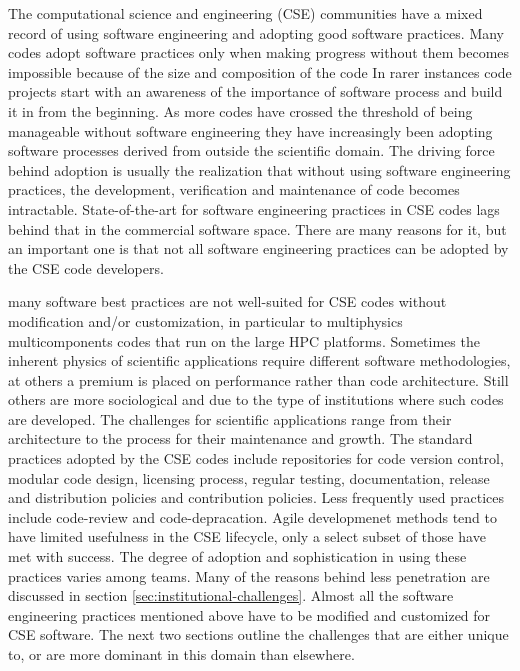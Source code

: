 \label{sec:introduction}
The computational science and engineering (CSE) communities have a mixed record
of using software engineering and adopting good software
practices. Many codes adopt software practices only when making
progress without them becomes impossible because of the size and
composition of the code  In rarer instances code projects start with
an awareness of the importance of software process and build it in
from the beginning. As more codes have crossed the threshold of being 
manageable without software engineering they have increasingly been  
adopting software processes derived from outside the scientific
domain. The driving force behind adoption is usually the realization
that without using software engineering practices, the development,
verification and maintenance of code becomes
intractable. State-of-the-art for software engineering
practices in CSE codes lags behind that in the commercial software
space. There are many reasons for it, but an important one is that
not all software engineering practices can be adopted by the CSE code
developers. 

many software best practices are not well-suited for CSE codes without
modification and/or customization, in particular to multiphysics
multicomponents codes that run on the large HPC platforms. Sometimes
the inherent physics of scientific applications require different
software methodologies, at others a premium is placed on
performance rather than code architecture.  Still others are more
sociological and due to the type of institutions where such codes are
developed. The challenges for scientific applications range
from their architecture to the process for their maintenance and
growth. The standard practices adopted by the CSE codes include
repositories for code version control, modular code design, licensing
process, regular testing, documentation, release and distribution
policies and contribution policies. Less frequently used practices
include code-review and code-depracation. Agile developmenet methods
tend to have limited usefulness in the CSE lifecycle, only a
select subset of those have met with success. The degree of adoption and
sophistication in using these  practices varies among teams. Many of
the reasons behind less penetration are discussed in section
\ref{sec:institutional-challenges}. Almost all the software
engineering practices mentioned above have to be modified and
customized for CSE software. The next two sections outline the
challenges that are either unique to, or are more dominant in this
domain than elsewhere. 


